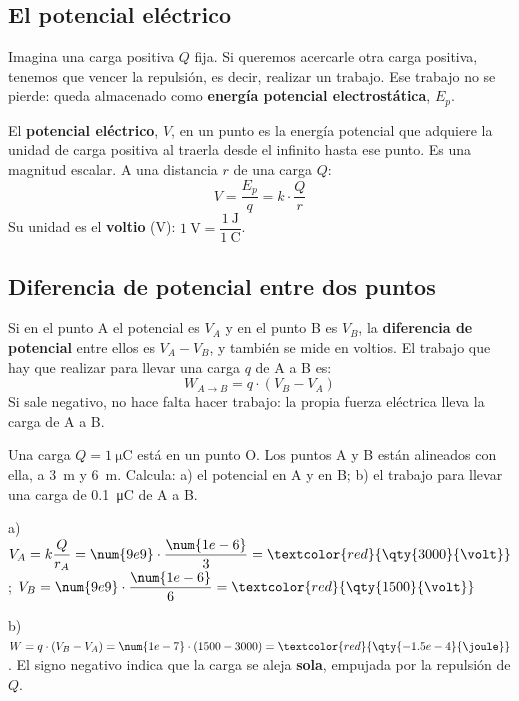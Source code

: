 \subsection{El potencial eléctrico}

Imagina una carga positiva \(Q\) fija. Si queremos acercarle otra carga positiva, tenemos que vencer la repulsión, es decir, realizar un trabajo. Ese trabajo no se pierde: queda almacenado como \textbf{energía potencial electrostática}, \(E_p\).

\begin{definition}
    El \textbf{potencial eléctrico}, \(V\), en un punto es la energía potencial que adquiere la unidad de carga positiva al traerla desde el infinito hasta ese punto. Es una magnitud escalar. A una distancia \(r\) de una carga \(Q\):
    \[ V = \frac{E_p}{q} = k \cdot \frac{Q}{r} \]
    Su unidad es el \textbf{voltio} (\unit{\volt}): \(\qty{1}{\volt} = \dfrac{\qty{1}{\joule}}{\qty{1}{\coulomb}}\).
\end{definition}

\subsection{Diferencia de potencial entre dos puntos}

Si en el punto A el potencial es \(V_A\) y en el punto B es \(V_B\), la \textbf{diferencia de potencial} entre ellos es \(V_A - V_B\), y también se mide en voltios. El trabajo que hay que realizar para llevar una carga \(q\) de A a B es:
\[ W_{A \to B} = q \cdot (V_B - V_A) \]
Si sale negativo, no hace falta hacer trabajo: la propia fuerza eléctrica lleva la carga de A a B.

\begin{example}
    Una carga \(Q = \qty{1}{\micro\coulomb}\) está en un punto O. Los puntos A y B están alineados con ella, a \qty{3}{\m} y \qty{6}{\m}. Calcula: a) el potencial en A y en B; b) el trabajo para llevar una carga de \qty{0.1}{\micro\coulomb} de A a B.

    a) \(V_A = k \dfrac{Q}{r_A} = \num{9e9} \cdot \dfrac{\num{1e-6}}{3} = \textcolor{red}{\qty{3000}{\volt}}\); \quad \(V_B = \num{9e9} \cdot \dfrac{\num{1e-6}}{6} = \textcolor{red}{\qty{1500}{\volt}}\)

    b) \(W = q \cdot (V_B - V_A) = \num{1e-7} \cdot (1500 - 3000) = \textcolor{red}{\qty{-1.5e-4}{\joule}}\). El signo negativo indica que la carga se aleja \textbf{sola}, empujada por la repulsión de \(Q\).
\end{example}

